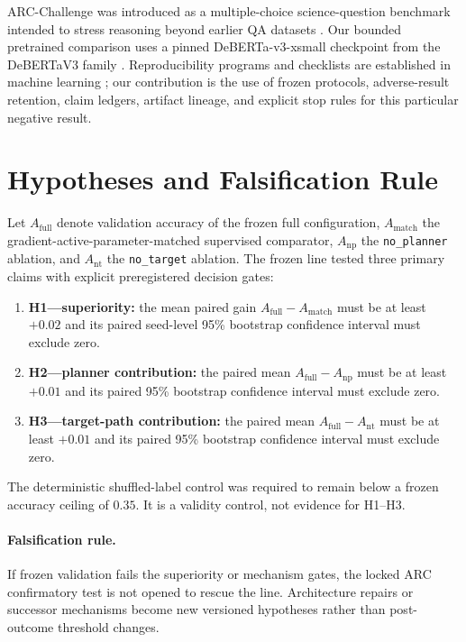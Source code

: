 \documentclass[twoside]{article}
\begin{document}
ARC-Challenge was introduced as a multiple-choice science-question benchmark intended to stress reasoning beyond earlier QA datasets \citep{clark2018arc}. Our bounded pretrained comparison uses a pinned DeBERTa-v3-xsmall checkpoint from the DeBERTaV3 family \citep{he2023debertav3}. Reproducibility programs and checklists are established in machine learning \citep{pineau2021reproducibility}; our contribution is the use of frozen protocols, adverse-result retention, claim ledgers, artifact lineage, and explicit stop rules for this particular negative result.

\section{Hypotheses and Falsification Rule}
Let $A_{\mathrm{full}}$ denote validation accuracy of the frozen full configuration, $A_{\mathrm{match}}$ the gradient-active-parameter-matched supervised comparator, $A_{\mathrm{np}}$ the \texttt{no\_planner} ablation, and $A_{\mathrm{nt}}$ the \texttt{no\_target} ablation. The frozen line tested three primary claims with explicit preregistered decision gates:
\begin{enumerate}[leftmargin=*]
    \item \textbf{H1---superiority:} the mean paired gain $A_{\mathrm{full}}-A_{\mathrm{match}}$ must be at least $+0.02$ and its paired seed-level 95\% bootstrap confidence interval must exclude zero.
    \item \textbf{H2---planner contribution:} the paired mean $A_{\mathrm{full}}-A_{\mathrm{np}}$ must be at least $+0.01$ and its paired 95\% bootstrap confidence interval must exclude zero.
    \item \textbf{H3---target-path contribution:} the paired mean $A_{\mathrm{full}}-A_{\mathrm{nt}}$ must be at least $+0.01$ and its paired 95\% bootstrap confidence interval must exclude zero.
\end{enumerate}
The deterministic shuffled-label control was required to remain below a frozen accuracy ceiling of $0.35$. It is a validity control, not evidence for H1--H3.

\paragraph{Falsification rule.} If frozen validation fails the superiority or mechanism gates, the locked ARC confirmatory test is not opened to rescue the line. Architecture repairs or successor mechanisms become new versioned hypotheses rather than post-outcome threshold changes.
\end{document}
